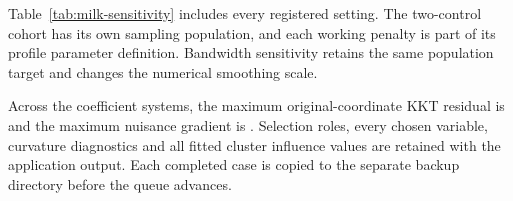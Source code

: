 Table~\ref{tab:milk-sensitivity} includes every registered setting.
The two-control cohort has its own sampling population, and each
working penalty is part of its profile parameter definition.
Bandwidth sensitivity retains the same population target and
changes the numerical smoothing scale.



Across the \MilkSystems{} coefficient systems, the maximum
original-coordinate KKT residual is \texttt{\MilkMaxKKT{}} and the
maximum nuisance gradient is \texttt{\MilkMaxNuisance{}}.
Selection roles, every chosen variable, curvature diagnostics and
all fitted cluster influence values are retained with the
application output. Each completed case is copied to the separate
backup directory before the queue advances.



